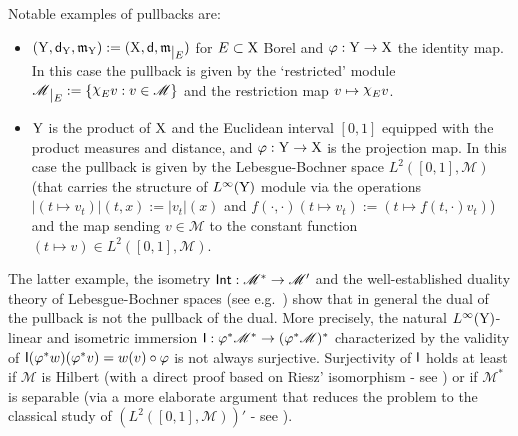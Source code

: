 \documentclass[11pt]{article}
\numberwithin{equation}{section}
\newcommand{\restr}[1]{\lower3pt\hbox{$|_{#1}$}}
\newcommand{\X}{{\rm X}}
\newcommand{\Y}{{\rm Y}}
\newcommand{\sfd}{{\sf d}}
\newcommand{\mm}{{\mathfrak m}}
\newcommand{\nchi}{{\raise.3ex\hbox{$\chi$}}}
\newcommand{\M}{\mathscr M}
\begin{document}
Notable examples of pullbacks are:
\begin{itemize}
\item[-] $(\Y,\sfd_\Y,\mm_\Y):=(\X,\sfd,\mm\restr E)$ for $E\subset\X$ Borel and $\varphi:\Y\to\X$ the identity map. In this case the pullback  is given by the `restricted' module $\M\restr E:=\{\nchi_Ev:v\in\M\}$ and the restriction map $v\mapsto\nchi_Ev$.
\item[-] $\Y$ is the product of $\X$ and the Euclidean interval $[0,1]$ equipped with the product measures and distance,   and $\varphi:\Y\to\X$ is the projection map. In this case the pullback is given by the Lebesgue-Bochner space $L^2([0,1],\M)$ (that carries the structure of $L^\infty(\Y)$ module via the operations $|(t\mapsto v_t)|(t,x):=|v_t|(x)$ and $f(\cdot,\cdot)(t\mapsto v_t):=(t\mapsto f(t,\cdot)v_t)$) and the map sending $v\in\M$ to the constant function $(t\mapsto v)\in L^2([0,1],\M)$.
\end{itemize}
The latter example, the isometry ${\sf Int}:\M^*\to\M'$ and the well-established duality theory of Lebesgue-Bochner spaces (see e.g.\ \cite{DiestelUhl77}) show that in general the dual of the pullback is not the pullback of the dual. More precisely, the natural $L^\infty(\Y)$-linear and isometric immersion ${\sf I}:\varphi^*\M^*\to(\varphi^*\M)^*$ characterized by the validity of ${\sf I}(\varphi^*w)(\varphi^*v)=w(v)\circ\varphi$ is not always surjective. Surjectivity of ${\sf I}$ holds at least if $\M$ is Hilbert (with a direct proof based on Riesz' isomorphism - see \cite[Proposition 1.32]{Gigli17}) or if $\M^*$ is separable (via a more elaborate argument that reduces the problem to the classical study of $(L^2([0,1],\M))'$ - see \cite[Theorem 1.6.7]{Gigli14}).

\medskip
\end{document}
